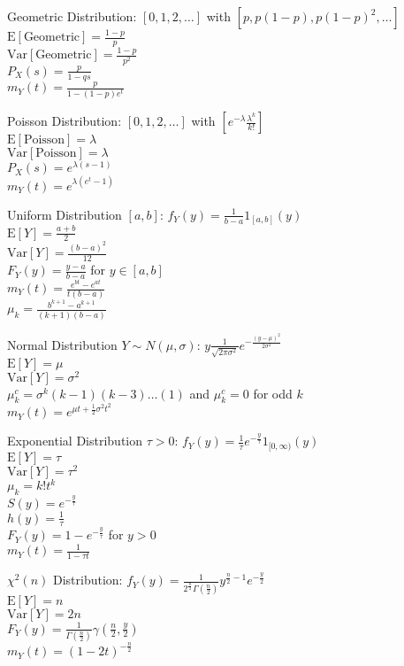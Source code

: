 Geometric Distribution: $[0,1,2,\dots]$ with $[p,p(1-p),p(1-p)^2,\dots]$ \\
$\text{E}[\text{Geometric}]=\frac{1-p}{p}$ \\
$\text{Var}[\text{Geometric}]=\frac{1-p}{p^2}$ \\
$P_X(s)=\frac{p}{1-qs}$ \\
$m_Y(t)=\frac{p}{1-(1-p)e^t}$

Poisson Distribution: $[0,1,2,\dots]$ with $[e^{-\lambda}\frac{\lambda^k}{k!}]$ \\
$\text{E}[\text{Poisson}]=\lambda$ \\
$\text{Var}[\text{Poisson}]=\lambda$ \\
$P_X(s)=e^{\lambda(s-1)}$ \\
$m_Y(t)=e^{\lambda (e^t-1)}$

Uniform Distribution $[a,b]$: $f_Y(y)=\frac{1}{b-a}1_{[a,b]}(y)$ \\
$\text{E}[Y]=\frac{a+b}{2}$ \\
$\text{Var}[Y]=\frac{(b-a)^2}{12}$ \\
$F_Y(y)=\frac{y-a}{b-a}$ for $y\in [a,b]$ \\
$m_Y(t)=\frac{e^{bt}-e^{at}}{t(b-a)}$ \\
$\mu_k=\frac{b^{k+1}-a^{k+1}}{(k+1)(b-a)}$

Normal Distribution $Y\sim N(\mu,\sigma)$: $y\frac{1}{\sqrt{2\pi\sigma^2}}e^{-\frac{(y-\mu)^2}{2\sigma^2}}$ \\
$\text{E}[Y]=\mu$ \\
$\text{Var}[Y]=\sigma^2$ \\
$\mu_k^c=\sigma^k(k-1)(k-3)\dots(1)$ and $\mu_k^c=0$ for odd $k$ \\
$m_Y(t)=e^{\mu t+ \frac{1}{2} \sigma^2 t^2}$ 

Exponential Distribution $\tau>0$: $f_Y(y)=\frac{1}{\tau}e^{-\frac{y}{\tau}}1_{[0,\infty)}(y)$ \\
$\text{E}[Y]=\tau$ \\
$\text{Var}[Y]=\tau^2$ \\
$\mu_k=k! t^k$ \\
$S(y)=e^{-\frac{y}{\tau}}$ \\
$h(y)=\frac{1}{\tau}$ \\
$F_Y(y)=1-e^{-\frac{y}{\tau}}$ for $y>0$ \\
$m_Y(t)=\frac{1}{1-\tau t}$

$\chi^2 (n)$ Distribution: $f_Y(y)=\frac{1}{2^{\frac{n}{2}} \Gamma (\frac{n}{2})} y^{\frac{n}{2}-1} e^{-\frac{y}{2}}$ \\
$\text{E}[Y]=n$ \\
$\text{Var}[Y]=2n$ \\
$F_Y(y)=\frac{1}{\Gamma (\frac{n}{2})} \gamma (\frac{n}{2},\frac{y}{2})$ \\
$m_Y(t)=(1-2t)^{-\frac{n}{2}}$

